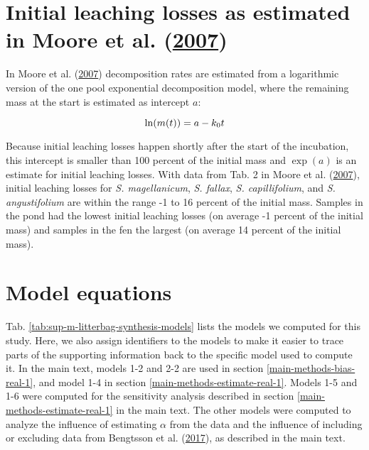 \documentclass[
  12pt,
]{article}
\author{}
\date{\vspace{-2.5em}}
\begin{document}
{
\setcounter{tocdepth}{2}
\tableofcontents
}
\renewcommand{\thefigure}{S\arabic{figure}} 
\renewcommand{\thetable}{S\arabic{table}}
\renewcommand{\thesection}{S\arabic{section}}
\renewcommand{\theequation}{S\arabic{equation}}

\hypertarget{sup-1}{%
\section{\texorpdfstring{Initial leaching losses as estimated in Moore et al. (\protect\hyperlink{ref-Moore.2007}{2007})}{Initial leaching losses as estimated in Moore et al. (2007)}}\label{sup-1}}

In Moore et al. (\protect\hyperlink{ref-Moore.2007}{2007}) decomposition rates are estimated from a logarithmic version of the one pool exponential decomposition model, where the remaining mass at the start is estimated as intercept \(a\):

\[
\ln(m(t)) = a - k_0t\\
\]

Because initial leaching losses happen shortly after the start of the incubation, this intercept is smaller than 100 percent of the initial mass and \(\exp(a)\) is an estimate for initial leaching losses. With data from Tab. 2 in Moore et al. (\protect\hyperlink{ref-Moore.2007}{2007}), initial leaching losses for \emph{S. magellanicum}, \emph{S. fallax}, \emph{S. capillifolium}, and \emph{S. angustifolium} are within the range -1 to 16 percent of the initial mass. Samples in the pond had the lowest initial leaching losses (on average -1 percent of the initial mass) and samples in the fen the largest (on average 14 percent of the initial mass).

\hypertarget{sup-13}{%
\section{Model equations}\label{sup-13}}

Tab. \ref{tab:sup-m-litterbag-synthesis-models} lists the models we computed for this study. Here, we also assign identifiers to the models to make it easier to trace parts of the supporting information back to the specific model used to compute it. In the main text, models 1-2 and 2-2 are used in section \ref{main-methods-bias-real-1}, and model 1-4 in section \ref{main-methods-estimate-real-1}. Models 1-5 and 1-6 were computed for the sensitivity analysis described in section \ref{main-methods-estimate-real-1} in the main text. The other models were computed to analyze the influence of estimating \(\alpha\) from the data and the influence of including or excluding data from Bengtsson et al. (\protect\hyperlink{ref-Bengtsson.2017}{2017}), as described in the main text.
\end{document}
